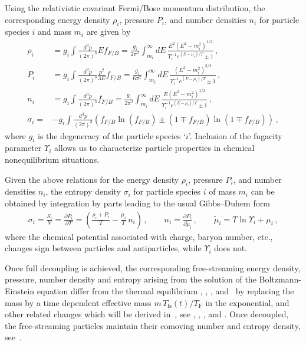 Using the relativistic covariant Fermi/Bose momentum distribution, the corresponding energy density $\rho_i$, pressure $P_i$, and number densities $n_i$ for particle species $i$ and mass $m_i$ are given by
\begin{align}
\rho_i&=g_i\int\!\!\frac{d^3p}{(2\pi)^3}Ef_{F/B}=\frac{g_i}{2\pi^2}\!\int_{m_i}^\infty\!\!\!dE\,\frac{E^2\left(E^2-m_i^2\right)^{1/2}}{\Upsilon_i^{-1}e^{(E-\mu_i)/T}\pm 1}\,,
\label{energy_density}\\[0.2cm]
P_i&=g_i\int\!\!\frac{d^3p}{(2\pi)^3}\frac{p^2}{3E}f_{F/B}=\frac{g_i}{6\pi^2}\!\int_{m_i}^\infty\!\!\!dE\,\frac{\left(E^2-m_i^2\right)^{3/2}}{\Upsilon_i^{-1} e^{(E-\mu_i)/T}\pm 1}\,,
\label{Pressure_density}\\[0.2cm]
n_i&=g_i\int\!\!\frac{d^3p}{(2\pi)^3}f_{F/B}=\frac{g_i}{2\pi^2}\!\int_{m_i}^\infty\!\!\!dE\,\frac{E(E^2-m_i^2)^{1/2} }{\Upsilon_i^{-1}e^{(E-\mu_i)/T}\pm 1}\,,
\label{number_density}\\[0.2cm]
\sigma_i=&-g_i\int\!\! \frac{d^3p }{(2\pi)^3}(f_{F/B}\ln(f_{F/B})\pm(1\mp f_{F/B})\ln(1\mp f_{F/B}))
\,,
\end{align}
where $g_i$ is the degeneracy of the particle species `$i$'. Inclusion of the fugacity parameter $\Upsilon_i$ allows us to characterize particle properties in chemical nonequilibrium situations. 

{\color{black}Given the above relations for the energy density $\rho_i$, pressure $P_i$, and number densities $n_i$, the entropy density $\sigma_i$\label{entropy_density} for particle species $i$ of mass $m_i$ can be obtained by integration by parts leading to the usual Gibbs–Duhem form}
\begin{align}\label{entropy}
\sigma_i=\frac{S_i}{V}=\frac{\partial P_i}{\partial T}=\left(\frac{\rho_i+P_i}{T}-\frac{\tilde \mu_i}{T}\,n_i\right)\,,\qquad
n_i=\frac{\partial P_i}{\partial \tilde{\mu}_i}\,,\qquad
\tilde \mu_i=T\ln \Upsilon_i +\mu_i\,,
\end{align}
where the chemical potential associated with charge, baryon number, etc., changes sign between particles and antiparticles, while $\Upsilon_i$ does not.

Once full decoupling is achieved, the corresponding free-streaming energy density, pressure, number density and entropy arising from the solution of the Boltzmann-Einstein equation differ from the thermal equilibrium , , , and~ by replacing the mass by a time dependent effective mass $m\,T_\mathrm{fs}(t)/T_\mathrm{F}$ in the exponential, and other related changes which will be derived in~, see , , , and . Once decoupled, the free-streaming particles maintain their comoving number and entropy density, see~.

